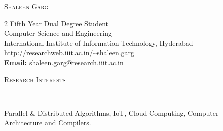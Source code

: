 \documentclass[10pt]{article}
\newenvironment{changemargin}[2]{%
    \begin{list}{}{%
            \setlength{\topsep}{0pt}%
            \setlength{\leftmargin}{#1}%
            \setlength{\rightmargin}{#2}%
            \setlength{\listparindent}{\parindent}%
        \setlength{\itemindent}{\parindent}%
            \setlength{\parsep}{\parskip}%
        }%
\item[]}{\end{list}
}
\newcommand{\lineover}{
    \begin{changemargin}{-0.05in}{-0.10in}
        \vspace*{-8pt}
        \hrulefill \\
        \vspace*{-2pt}
    \end{changemargin}
}
\newcommand{\header}[1]{
    \begin{changemargin}{-0.75in}{-0.75in}
        \scshape{#1}\\
        \lineover
    \end{changemargin}
}
\newcommand{\name}[1]{
    \begin{changemargin}{-0.6in}{-0.6in}
        \begin{center}
            {\Large \scshape {#1}}
        \end{center}
    \end{changemargin}
}
\newcommand{\contact}[6]{
    \begin{changemargin}{-0.65in}{-0.65in}
        \begin{multicols}{2}
            {#1}\\ \smallskip 
            {#2}\\ \smallskip
            {#3}\\ \smallskip
            {#4}\\ \smallskip 
            {#5}\\ \smallskip
            {#6}
        \end{multicols}
    \end{changemargin}
}
\newenvironment{body} {
    \vspace*{-16pt}
    \begin{changemargin}{-0.6in}{-0.65in}
    }   
    {\end{changemargin}
}
\begin{document}
\name{Shaleen Garg}

\contact{Fifth Year Dual Degree Student}{Computer Science and Engineering}{International Institute of Information Technology, Hyderabad}{\hspace{60pt} \url{http://researchweb.iiit.ac.in/~shaleen.garg}}{\hspace{60pt} \textbf{Email:} shaleen.garg@research.iiit.ac.in}{\hspace{60pt} }

\header{Research Interests}
\vspace{14pt}
\begin{body}
    Parallel \& Distributed Algorithms, IoT, Cloud Computing, Computer Architecture and Compilers.
\end{body}
\smallskip
\end{document}
